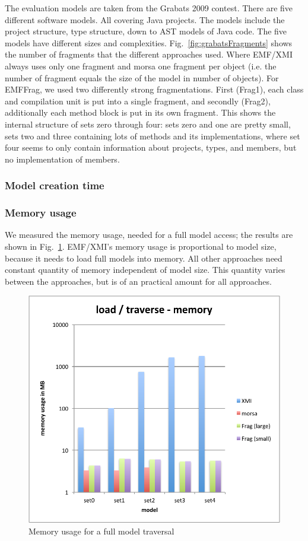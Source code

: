The evaluation models are taken from the Grabats 2009 contest. There are five different software models. All covering Java projects. The models include the project structure, type structure, down to AST models of Java code. The five models have different sizes and complexities. Fig.~\ref{fig:grabatsFragments} shows the number of fragments that the different approaches used. Where EMF/XMI always uses only one fragment and morsa one fragment per object (i.e. the number of fragment equals the size of the model in number of objects). For EMFFrag, we used two differently strong fragmentations. First (Frag1), each class and compilation unit is put into a single fragment, and secondly (Frag2), additionally each method block is put in its own fragment. This shows the internal structure of sets zero through four: sets zero and one are pretty small, sets two and three containing lots of methods and its implementations, where set four seems to only contain information about projects, types, and members, but no implementation of members.

\subsubsection*{Model creation time}

\subsubsection*{Memory usage}

We measured the memory usage, needed for a full model access; the results are shown in Fig.~\ref{fig:grabatsLoadTraverseMem}. EMF/XMI's memory usage is proportional to model size, because it needs to load full models into memory. All other approaches need constant quantity of memory independent of model size. This quantity varies between the approaches, but is of an practical amount for all approaches. 

\begin{figure}
  \centering
  \includegraphics[width=0.65\linewidth]{figures/grabatsLoadTraverseMem}
  \caption{Memory usage for a full model traversal}
  \label{fig:grabatsLoadTraverseMem}
\end{figure}

